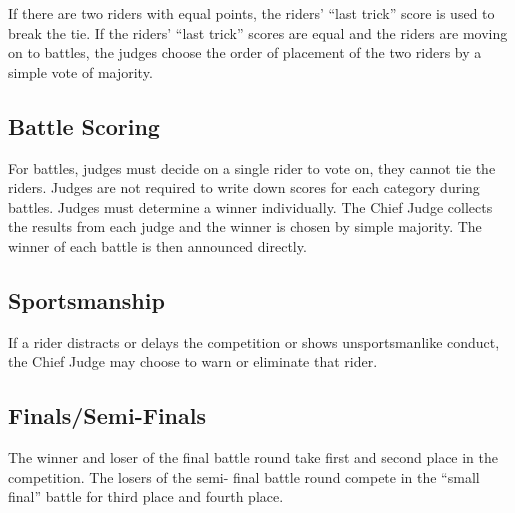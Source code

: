 If there are two riders with equal points, the riders' ``last trick'' score is used to break the tie.
If the riders' ``last trick'' scores are equal and the riders are moving on to battles, the judges choose the order of placement of the two riders by a simple vote of majority.

\subsection{Battle Scoring}
For battles, judges must decide on a single rider to vote on, they cannot tie the riders.
Judges are not required to write down scores for each category during battles.
Judges must determine a winner individually.
The Chief Judge collects the results from each judge and the winner is chosen by simple majority.
The winner of each battle is then announced directly.

\subsection{Sportsmanship}
If a rider distracts or delays the competition or shows unsportsmanlike conduct, the Chief Judge may choose to warn or eliminate that rider. 

\subsection{Finals/Semi-Finals}
The winner and loser of the final battle round take first and second place in the competition.
The losers of the semi- final battle round compete in the “small final” battle for third place and fourth place.
